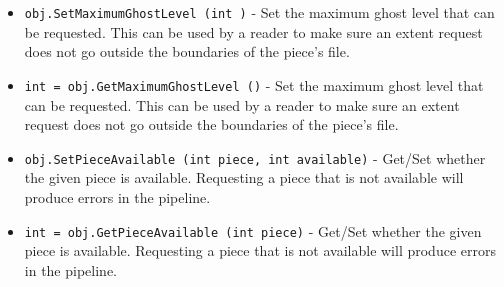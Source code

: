 \begin{itemize}
\item  \verb|obj.SetMaximumGhostLevel (int )| -  Set the maximum ghost level that can be requested.  This can be
 used by a reader to make sure an extent request does not go
 outside the boundaries of the piece's file.

\item  \verb|int = obj.GetMaximumGhostLevel ()| -  Set the maximum ghost level that can be requested.  This can be
 used by a reader to make sure an extent request does not go
 outside the boundaries of the piece's file.

\item  \verb|obj.SetPieceAvailable (int piece, int available)| -  Get/Set whether the given piece is available.  Requesting a piece
 that is not available will produce errors in the pipeline.

\item  \verb|int = obj.GetPieceAvailable (int piece)| -  Get/Set whether the given piece is available.  Requesting a piece
 that is not available will produce errors in the pipeline.

\end{itemize}
